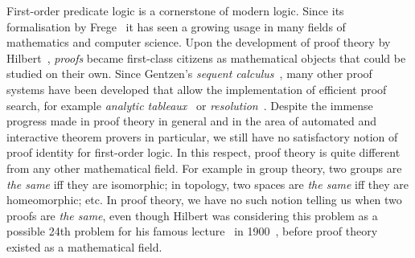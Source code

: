 \documentclass[conference,twosided,10pt]{IEEEtran}
\theoremstyle{definition}
\begin{document}
First-order predicate logic is a cornerstone of modern
logic. Since its formalisation by Frege~\cite{frege:79} it has seen a
growing usage in many fields of mathematics and computer science. Upon
the development of proof theory by Hilbert~\cite{hilbert:22},
\emph{proofs} became first-class citizens as mathematical objects that
could be studied on their own. Since Gentzen's \emph{sequent
calculus}~\cite{gentzen:35:I,gentzen:35:II}, many other proof systems
have been developed that allow the implementation of efficient proof
search, for example \emph{analytic tableaux}~\cite{smullyan:68} or
\emph{resolution}~\cite{robinson:65}. Despite the immense progress
made in proof theory in general and in the area of
automated and interactive theorem provers in
particular, we still have
no satisfactory notion of proof identity for first-order logic. In
this respect, proof theory is quite different from any other
mathematical field. For example in group theory, two groups are
\emph{the same} iff they are isomorphic; in topology, two spaces are
\emph{the same} iff they are homeomorphic; etc. In proof theory, we
have no such notion telling us when two proofs are \emph{the same},
even though Hilbert was considering this problem as a possible 24th
problem for his famous lecture~\cite{hilbert:00} in
1900~\cite{thiele:03}, before proof theory existed as a mathematical
field.
\end{document}
